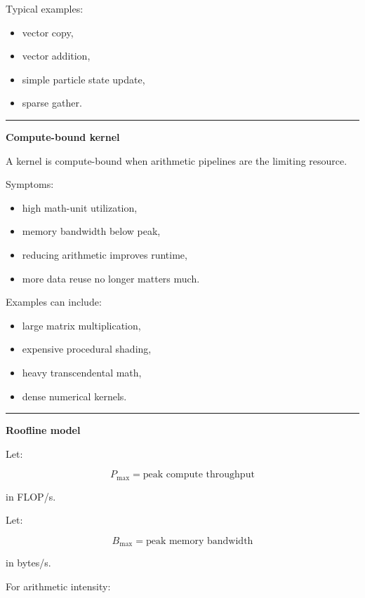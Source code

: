 Typical examples:

\begin{itemize}
\tightlist
\item
  vector copy,
\item
  vector addition,
\item
  simple particle state update,
\item
  sparse gather.
\end{itemize}

\begin{center}\rule{0.5\linewidth}{0.5pt}\end{center}

\textbf{Compute-bound kernel}

A kernel is compute-bound when arithmetic pipelines are the limiting resource.

Symptoms:

\begin{itemize}
\tightlist
\item
  high math-unit utilization,
\item
  memory bandwidth below peak,
\item
  reducing arithmetic improves runtime,
\item
  more data reuse no longer matters much.
\end{itemize}

Examples can include:

\begin{itemize}
\tightlist
\item
  large matrix multiplication,
\item
  expensive procedural shading,
\item
  heavy transcendental math,
\item
  dense numerical kernels.
\end{itemize}

\begin{center}\rule{0.5\linewidth}{0.5pt}\end{center}

\textbf{Roofline model}

Let:

\[
P_{\max}
=
\text{peak compute throughput}
\]

in FLOP/s.

Let:

\[
B_{\max}
=
\text{peak memory bandwidth}
\]

in bytes/s.

For arithmetic intensity:


